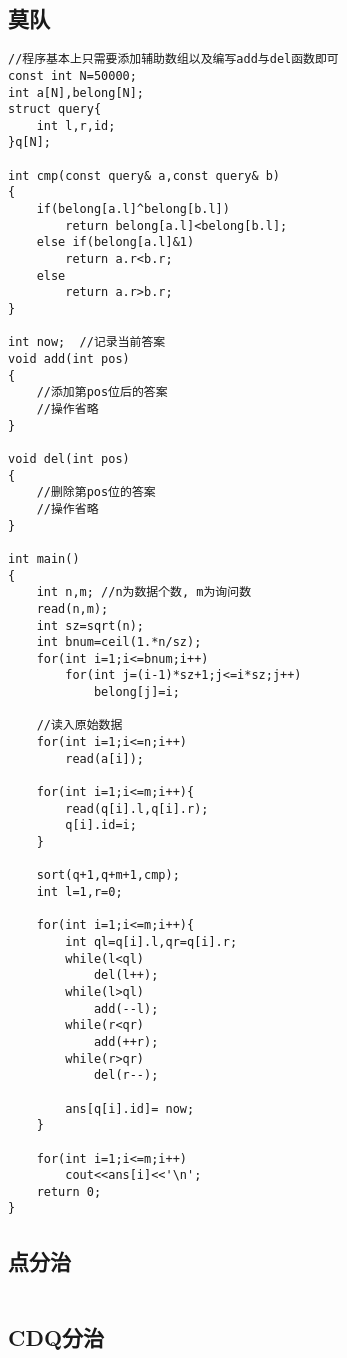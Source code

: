 \documentclass[twocolumn,a4]{article}
\begin{document}
\subsection{莫队}
\begin{lstlisting}
//程序基本上只需要添加辅助数组以及编写add与del函数即可
const int N=50000;
int a[N],belong[N];
struct query{
    int l,r,id;
}q[N];

int cmp(const query& a,const query& b)
{
    if(belong[a.l]^belong[b.l])
        return belong[a.l]<belong[b.l];
    else if(belong[a.l]&1)
        return a.r<b.r;
    else
        return a.r>b.r;
}

int now;  //记录当前答案
void add(int pos)
{
    //添加第pos位后的答案
    //操作省略
}

void del(int pos)
{
    //删除第pos位的答案
    //操作省略
}

int main()
{
    int n,m; //n为数据个数, m为询问数
    read(n,m);
    int sz=sqrt(n);
    int bnum=ceil(1.*n/sz);
    for(int i=1;i<=bnum;i++)
        for(int j=(i-1)*sz+1;j<=i*sz;j++)
            belong[j]=i;
    
    //读入原始数据
    for(int i=1;i<=n;i++)
        read(a[i]);
    
    for(int i=1;i<=m;i++){
        read(q[i].l,q[i].r);
        q[i].id=i;
    }

    sort(q+1,q+m+1,cmp);
    int l=1,r=0;

    for(int i=1;i<=m;i++){
        int ql=q[i].l,qr=q[i].r;
        while(l<ql)
            del(l++);
        while(l>ql)
            add(--l);
        while(r<qr)
            add(++r);
        while(r>qr)
            del(r--);
        
        ans[q[i].id]= now;
    }

    for(int i=1;i<=m;i++)
        cout<<ans[i]<<'\n';
    return 0;
}
\end{lstlisting}

\subsection{点分治}
\begin{lstlisting}

\end{lstlisting}

\subsection{CDQ分治}
\begin{lstlisting}

\end{lstlisting}
\end{document}
